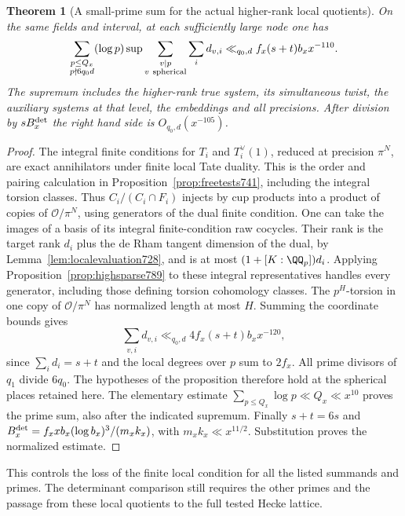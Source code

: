 \documentclass[a4paper,11pt]{article}
\newtheorem{theorem}[proposition]{Theorem}
\theoremstyle{definition}
\theoremstyle{remark}
\numberwithin{equation}{section}
\begin{document}
\begin{theorem}[A small-prime sum for the actual higher-rank local quotients]
\leavevmode\label{thm:highsmall789}
On the same fields and interval, at each sufficiently
large node one has
\[
 \sum_{\substack{p\le Q_x\\p\nmid6q_0d}}(\log p)
   \sup\sum_{\substack{v\mid p\\v\ {\rm spherical}}}
                     \sum_i d_{v,i}
       \ll_{q_0,d} f_x(s+t)b_x x^{-110}.
\]
The supremum includes the higher-rank true system,
its simultaneous twist, the auxiliary systems at that
level, the embeddings and all precisions. After
division by \(sB_x^{\rm det}\) the right hand side
is \(O_{q_0,d}(x^{-105})\).
\end{theorem}
\begin{proof}
The integral finite conditions for \(T_i\) and
\(T_i^\vee(1)\), reduced at precision \(\pi^N\),
are exact annihilators under finite local Tate
duality. This is the order and pairing calculation
in Proposition~\ref{prop:freetests741}, including
the integral torsion classes. Thus \(C_i/(C_i\cap F_i)\)
injects by cup products into a product of copies of
\(\mathcal O/\pi^N\), using generators of the dual
finite condition. One can take the images of a basis
of its integral finite-condition raw cocycles. Their
rank is the target rank \(d_i\) plus the de Rham
tangent dimension of the dual, by
Lemma~\ref{lem:localevaluation728}, and is at most
\((1+[K:\QQ_p])d_i\). Applying
Proposition~\ref{prop:highsparse789} to these integral
representatives handles every generator, including
those defining torsion cohomology classes. The
\(p^H\)-torsion in one copy of \(\mathcal O/\pi^N\)
has normalized length at most \(H\). Summing the
coordinate bounds gives
\[
        \sum_{v,i} d_{v,i}
          \ll_{q_0,d} 4 f_x(s+t)b_x x^{-120},
\]
since \(\sum_i d_i=s+t\) and the local degrees over
\(p\) sum to \(2f_x\). All prime divisors of \(q_1\)
divide \(6q_0\). The hypotheses of the proposition
therefore hold at the spherical places retained here.
The elementary estimate \(\sum_{p\le Q_x}\log p\ll
Q_x\ll x^{10}\) proves the prime sum, also after the
indicated supremum. Finally \(s+t=6s\) and
\(B_x^{\rm det}=f_xxb_x(\log b_x)^3/(m_x k_x)\),
with \(m_x k_x\ll x^{11/2}\). Substitution proves
the normalized estimate.
\end{proof}
This controls the loss of the finite local condition
for all the listed summands and primes. The determinant
comparison still requires the other primes and the
passage from these local quotients to the full tested
Hecke lattice.
\clearpage
\end{document}
